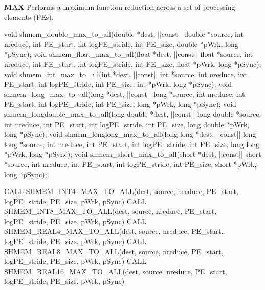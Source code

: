 \begin{apidefinition}
\bigskip
\textbf{MAX} \newline
Performs a maximum function reduction across a set of processing elements (\ac{PE}s).\newline
\begin{Csynopsis}
void shmem_double_max_to_all(double *dest, |\aftergroup{}|const|\aftergroup\prevcolor| double *source, int nreduce, int PE_start, int logPE_stride, int PE_size, double *pWrk, long *pSync);
void shmem_float_max_to_all(float *dest, |\aftergroup{}|const|\aftergroup\prevcolor| float *source, int nreduce, int PE_start, int logPE_stride, int PE_size, float *pWrk, long *pSync);
void shmem_int_max_to_all(int *dest, |\aftergroup{}|const|\aftergroup\prevcolor| int *source, int nreduce, int PE_start, int logPE_stride, int PE_size, int *pWrk, long *pSync);
void shmem_long_max_to_all(long *dest, |\aftergroup{}|const|\aftergroup\prevcolor| long *source, int nreduce, int PE_start, int logPE_stride, int PE_size, long *pWrk, long *pSync);
void shmem_longdouble_max_to_all(long double *dest, |\aftergroup{}|const|\aftergroup\prevcolor| long double *source, int nreduce, int PE_start, int logPE_stride, int PE_size, long double *pWrk, long *pSync);
void shmem_longlong_max_to_all(long long *dest, |\aftergroup{}|const|\aftergroup\prevcolor| long long *source, int nreduce, int PE_start, int logPE_stride, int PE_size, long long *pWrk, long *pSync);
void shmem_short_max_to_all(short *dest, |\aftergroup{}|const|\aftergroup\prevcolor| short *source, int nreduce, int PE_start, int logPE_stride, int PE_size, short *pWrk, long *pSync);
\end{Csynopsis}

\begin{Fsynopsis}
CALL SHMEM_INT4_MAX_TO_ALL(dest, source, nreduce, PE_start, logPE_stride, PE_size, pWrk, pSync)
CALL SHMEM_INT8_MAX_TO_ALL(dest, source, nreduce, PE_start, logPE_stride, PE_size, pWrk, pSync)
CALL SHMEM_REAL4_MAX_TO_ALL(dest, source, nreduce, PE_start, logPE_stride, PE_size, pWrk, pSync)
CALL SHMEM_REAL8_MAX_TO_ALL(dest, source, nreduce, PE_start, logPE_stride, PE_size, pWrk, pSync)
CALL SHMEM_REAL16_MAX_TO_ALL(dest, source, nreduce, PE_start, logPE_stride, PE_size, pWrk, pSync)
\end{Fsynopsis}


\end{apidefinition}
